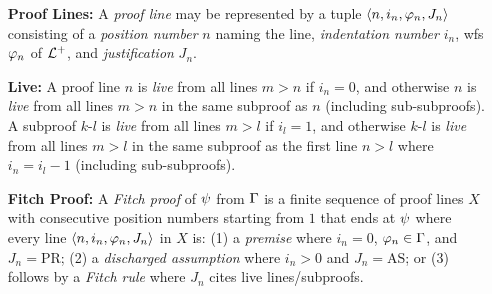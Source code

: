 \documentclass[a4paper, 11pt]{article} %
\begin{document}
\begin{enumerate}
	\item[\bf Proof Lines:] A \textit{proof line} may be represented by a tuple $\langle n,i_n,\varphi_n,J_n\rangle$ consisting of a \textit{position number} $n$ naming the line, \textit{indentation number} $i_n$, wfs $\varphi_n$ of $\mathcal{L}^+$, and \textit{justification} $J_n$. %
	\item[\bf Live:]
	      A proof line $n$ is \textit{live} from all lines $m > n$ if $i_n = 0$, and otherwise $n$ is \textit{live} from all lines $m > n$ in the same subproof as $n$ (including sub-subproofs).
	      A subproof $k$-$l$ is \textit{live} from all lines $m > l$ if $i_l = 1$, and otherwise $k$-$l$ is \textit{live} from all lines $m > l$ in the same subproof as the first line $n > l$ where $i_n = i_l - 1$ (including sub-subproofs).
	\item[\bf Fitch Proof:] A \textit{Fitch proof} of $\psi$ from $\Gamma$ is a finite sequence of proof lines $X$ with consecutive position numbers starting from $1$ that ends at $\psi$ where every line $\langle n,i_n,\varphi_n,J_n\rangle$ in $X$ is: (1) a \textit{premise} where $i_n = 0$, $\varphi_n \in \Gamma$, and $J_n = \text{PR}$; (2) a \textit{discharged assumption} where $i_n > 0$ and $J_n = \text{AS}$; or (3) follows by a \textit{Fitch rule} where $J_n$ cites live lines/subproofs.

\end{enumerate}
\end{document}
